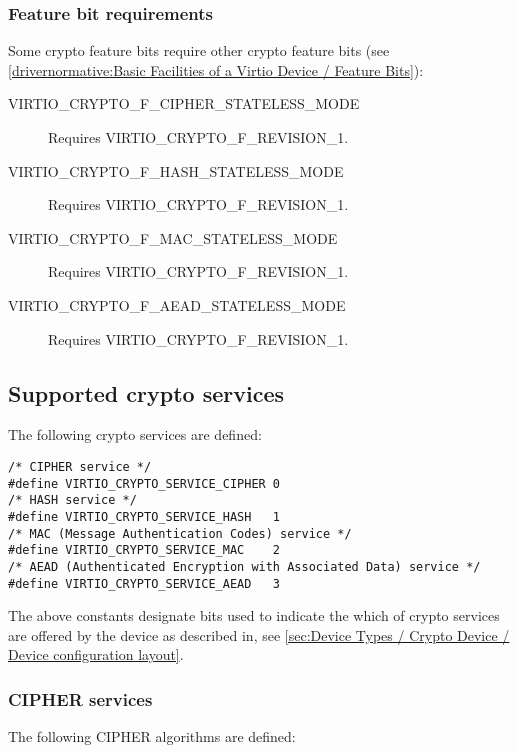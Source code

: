 \subsubsection{Feature bit requirements}\label{sec:Device Types / Crypto Device / Feature bits}

Some crypto feature bits require other crypto feature bits
(see \ref{drivernormative:Basic Facilities of a Virtio Device / Feature Bits}):

\begin{description}
\item[VIRTIO_CRYPTO_F_CIPHER_STATELESS_MODE] Requires VIRTIO_CRYPTO_F_REVISION_1.
\item[VIRTIO_CRYPTO_F_HASH_STATELESS_MODE] Requires VIRTIO_CRYPTO_F_REVISION_1.
\item[VIRTIO_CRYPTO_F_MAC_STATELESS_MODE] Requires VIRTIO_CRYPTO_F_REVISION_1.
\item[VIRTIO_CRYPTO_F_AEAD_STATELESS_MODE] Requires VIRTIO_CRYPTO_F_REVISION_1.
\end{description}

\subsection{Supported crypto services}\label{sec:Device Types / Crypto Device / Supported crypto services}

The following crypto services are defined:

\begin{lstlisting}
/* CIPHER service */
#define VIRTIO_CRYPTO_SERVICE_CIPHER 0
/* HASH service */
#define VIRTIO_CRYPTO_SERVICE_HASH   1
/* MAC (Message Authentication Codes) service */
#define VIRTIO_CRYPTO_SERVICE_MAC    2
/* AEAD (Authenticated Encryption with Associated Data) service */
#define VIRTIO_CRYPTO_SERVICE_AEAD   3
\end{lstlisting}

The above constants designate bits used to indicate the which of crypto services are
offered by the device as described in, see \ref{sec:Device Types / Crypto Device / Device configuration layout}.

\subsubsection{CIPHER services}\label{sec:Device Types / Crypto Device / Supported crypto services / CIPHER services}

The following CIPHER algorithms are defined:

